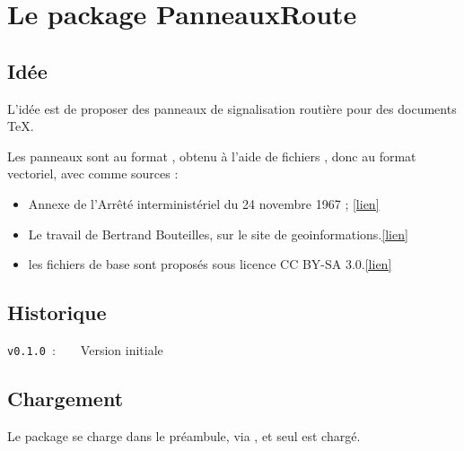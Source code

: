 \documentclass[french,11pt,a4paper]{article}
\begin{document}
\section{Le package PanneauxRoute}

\subsection{Idée}

L'idée est de proposer des panneaux de signalisation routière pour des documents \TeX.

\smallskip

Les panneaux sont au format , obtenu à l'aide de fichiers , donc au format vectoriel, avec comme sources :

\medskip

\begin{itemize}
	\item \og Annexe de l’Arrêté interministériel du 24 novembre 1967 \fg{} ;  \hfill\href{https://equipementsdelaroute.cerema.fr/version-consolidee-de-l-arrete-du-24-novembre-1967-a537.html}{[lien]}
	\item Le travail de Bertrand Bouteilles, sur le site de geoinformations.\hfill\href{https://www.geoinformations.developpement-durable.gouv.fr/panneaux-routiers-au-format-svg-et-png-par-a2688.html}{[lien]}
	\item les fichiers  de base sont proposés sous licence CC BY-SA 3.0.\hfill\href{http://sig974.free.fr/?p=1520}{[lien]}
\end{itemize}

\subsection{Historique}

\verb|v0.1.0|~:~~~~Version initiale

\subsection{Chargement}

Le package se charge dans le préambule, via , et seul  est chargé.

\begin{codehigh}[language=latex/latex3,style/main=cyan!5,style/code=cyan!5]
\usepackage{PanneauxRoute}
\end{codehigh}
\end{document}
